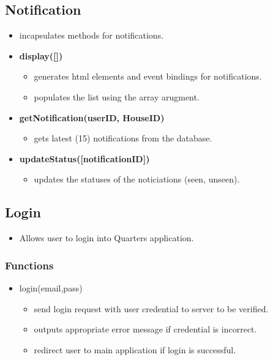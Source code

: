 \documentclass[12pt]{article}
\begin{document}
\subsection{Notification}
\begin{itemize}
  \item incapsulates methods for notifications.
  \item \textbf{display([])}
    \begin{itemize}
    \item generates html elements and event bindings for notifications.
    \item populates the list using the array arugment.
    \end{itemize}
  \item \textbf{getNotification(userID, HouseID)}
    \begin{itemize}
    \item gets latest (15) notifications from the database.
    \end{itemize}
  \item \textbf{updateStatus([notificationID])}
    \begin{itemize}
    \item updates the statuses of the noticiations (seen, unseen).
    \end{itemize}
\end{itemize}
\subsection{Login}
\begin{itemize}
    \item Allows user to login into Quarters application.
\end{itemize}
\subsubsection{Functions}
\begin{itemize}
    \item login(email,pass)
    \begin{itemize}
        \item send login request with user credential to server to be verified.
        \item outputs appropriate error message if credential is incorrect.
        \item redirect user to main application if login is successful.
    \end{itemize}
\end{itemize}
\end{document}
